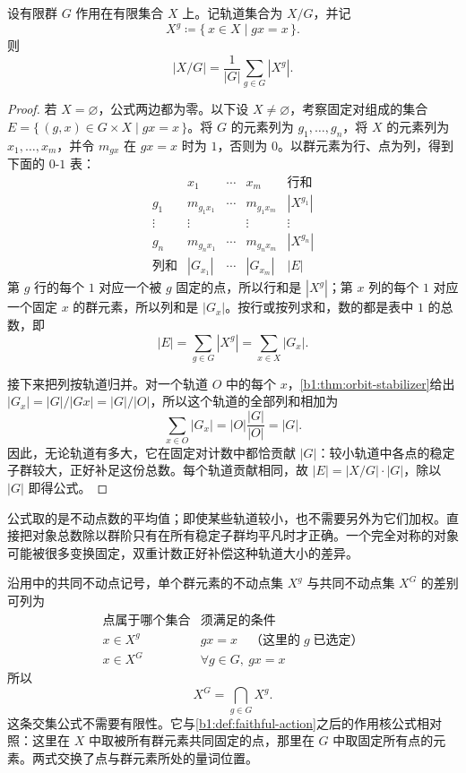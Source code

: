 \begin{theorem}\label{b1:thm:burnside-count}
	设有限群 \(G\) 作用在有限集合 \(X\) 上。记轨道集合为 \(X/G\)，并记
	\[
		X^g\coloneqq\{\,x\in X\mid gx=x\,\}.
	\]
	则
	\[
		|X/G|=\frac{1}{|G|}\sum_{g\in G}|X^g|.
	\]
\end{theorem}
\begin{proof}
	若 \(X=\varnothing\)，公式两边都为零。以下设 \(X\ne\varnothing\)，考察固定对组成的集合 \(E=\bigl\{\,(g,x)\in G\times X\mid gx=x\,\bigr\}\)。将 \(G\) 的元素列为 \(g_1,\ldots,g_n\)，将 \(X\) 的元素列为 \(x_1,\ldots,x_m\)，并令 \(m_{gx}\) 在 \(gx=x\) 时为 \(1\)，否则为 \(0\)。以群元素为行、点为列，得到下面的 \(0\)-\(1\) 表：
	\[
		\begin{array}{c|ccc|c}
			& x_1 & \cdots & x_m & \text{行和} \\
			\hline
			g_1 & m_{g_1x_1} & \cdots & m_{g_1x_m} & |X^{g_1}| \\
			\vdots & \vdots & & \vdots & \vdots \\
			g_n & m_{g_nx_1} & \cdots & m_{g_nx_m} & |X^{g_n}| \\
			\hline
			\text{列和} & |G_{x_1}| & \cdots & |G_{x_m}| & |E|
		\end{array}
	\]
	第 \(g\) 行的每个 \(1\) 对应一个被 \(g\) 固定的点，所以行和是 \(|X^g|\)；第 \(x\) 列的每个 \(1\) 对应一个固定 \(x\) 的群元素，所以列和是 \(|G_x|\)。按行或按列求和，数的都是表中 \(1\) 的总数，即
	\[
		|E|=\sum_{g\in G}|X^g|=\sum_{x\in X}|G_x|.
	\]

	接下来把列按轨道归并。对一个轨道 \(O\) 中的每个 \(x\)，\cref{b1:thm:orbit-stabilizer}给出 \(|G_x|=|G|/|Gx|=|G|/|O|\)，所以这个轨道的全部列和相加为
	\[
		\sum_{x\in O}|G_x|=|O|\frac{|G|}{|O|}=|G|.
	\]
	因此，无论轨道有多大，它在固定对计数中都恰贡献 \(|G|\)：较小轨道中各点的稳定子群较大，正好补足这份总数。每个轨道贡献相同，故 \(|E|=|X/G|\cdot|G|\)，除以 \(|G|\) 即得公式。
\end{proof}

公式取的是不动点数的平均值；即使某些轨道较小，也不需要另外为它们加权。直接把对象总数除以群阶只有在所有稳定子群均平凡时才正确。一个完全对称的对象可能被很多变换固定，双重计数正好补偿这种轨道大小的差异。

\ProseParagraphBreak
沿用中的共同不动点记号，单个群元素的不动点集 \(X^g\) 与共同不动点集 \(X^G\) 的差别可列为
\[
	\begin{array}{c|l}
		\text{点属于哪个集合} & \text{须满足的条件} \\
		\hline
		x\in X^g & gx=x\quad\text{（这里的}\;g\;\text{已选定）} \\
		x\in X^G & \forall g\in G,\ gx=x
	\end{array}
\]
所以
\[
	X^G=\bigcap_{g\in G}X^g.
\]
这条交集公式不需要有限性。它与\cref{b1:def:faithful-action}之后的作用核公式相对照：这里在 \(X\) 中取被所有群元素共同固定的点，那里在 \(G\) 中取固定所有点的元素。两式交换了点与群元素所处的量词位置。

